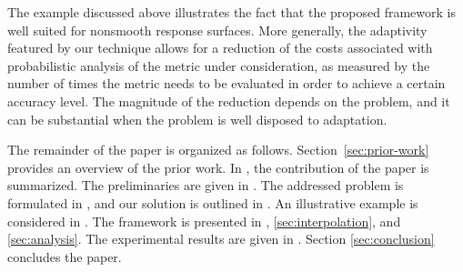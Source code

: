 The example discussed above illustrates the fact that the proposed framework is
well suited for nonsmooth response surfaces. More generally, the adaptivity
featured by our technique allows for a reduction of the costs associated with
probabilistic analysis of the metric under consideration, as measured by the
number of times the metric needs to be evaluated in order to achieve a certain
accuracy level. The magnitude of the reduction depends on the problem, and it
can be substantial when the problem is well disposed to adaptation.

The remainder of the paper is organized as follows. Section~\ref{sec:prior-work}
provides an overview of the prior work. In , the contribution
of the paper is summarized. The preliminaries are given in .
The addressed problem is formulated in , and our solution is
outlined in . An illustrative example is considered in
. The framework is presented in ,
\ref{sec:interpolation}, and \ref{sec:analysis}. The experimental results are
given in . Section \ref{sec:conclusion} concludes the
paper.
